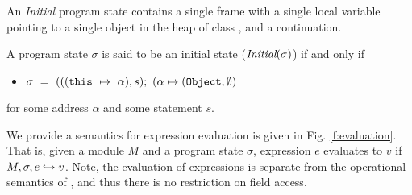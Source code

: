 An \emph{Initial} program state contains a single frame 
with a single local variable  pointing to a single object 
in the heap of class , and a continuation.
\begin{definition}
\label{def:initial}
A program state $\sigma$ is said to be an initial state ($\textit{Initial}(\sigma)$)
if and only if
\begin{itemize}
\item
$\sigma\ =\  ( ((\prg{this}\ \mapsto\ \alpha), s); \  (\alpha \mapsto (\prg{Object}, \emptyset)$
\end{itemize} 
for some address $\alpha$ and some statement $s$.
\end{definition}



We provide a semantics for expression evaluation is given in Fig. \ref{f:evaluation}. 
That is, given a module $M$ and a program state $\sigma$, expression $e$ evaluates to $v$
if $M, \sigma, e \hookrightarrow v$. Note, the evaluation of expressions is separate from the operational
semantics of \LangOO, and thus there is no restriction on field access.

